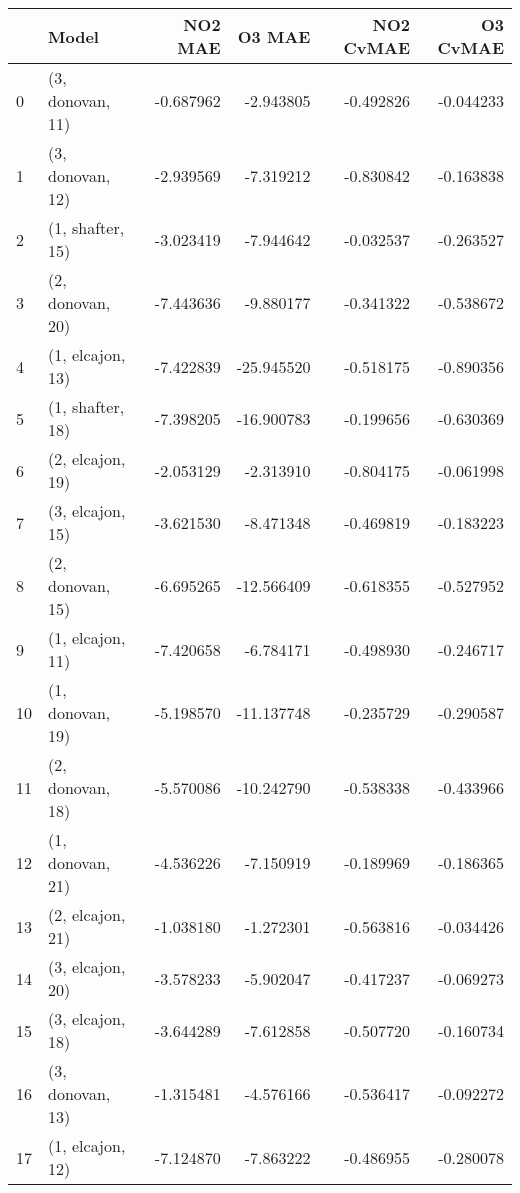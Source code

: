 \begin{tabular}{llrrrr}
\toprule
{} &             Model &   NO2 MAE &     O3 MAE &  NO2 CvMAE &  O3 CvMAE \\
\midrule
0  &  (3, donovan, 11) & -0.687962 &  -2.943805 &  -0.492826 & -0.044233 \\
1  &  (3, donovan, 12) & -2.939569 &  -7.319212 &  -0.830842 & -0.163838 \\
2  &  (1, shafter, 15) & -3.023419 &  -7.944642 &  -0.032537 & -0.263527 \\
3  &  (2, donovan, 20) & -7.443636 &  -9.880177 &  -0.341322 & -0.538672 \\
4  &  (1, elcajon, 13) & -7.422839 & -25.945520 &  -0.518175 & -0.890356 \\
5  &  (1, shafter, 18) & -7.398205 & -16.900783 &  -0.199656 & -0.630369 \\
6  &  (2, elcajon, 19) & -2.053129 &  -2.313910 &  -0.804175 & -0.061998 \\
7  &  (3, elcajon, 15) & -3.621530 &  -8.471348 &  -0.469819 & -0.183223 \\
8  &  (2, donovan, 15) & -6.695265 & -12.566409 &  -0.618355 & -0.527952 \\
9  &  (1, elcajon, 11) & -7.420658 &  -6.784171 &  -0.498930 & -0.246717 \\
10 &  (1, donovan, 19) & -5.198570 & -11.137748 &  -0.235729 & -0.290587 \\
11 &  (2, donovan, 18) & -5.570086 & -10.242790 &  -0.538338 & -0.433966 \\
12 &  (1, donovan, 21) & -4.536226 &  -7.150919 &  -0.189969 & -0.186365 \\
13 &  (2, elcajon, 21) & -1.038180 &  -1.272301 &  -0.563816 & -0.034426 \\
14 &  (3, elcajon, 20) & -3.578233 &  -5.902047 &  -0.417237 & -0.069273 \\
15 &  (3, elcajon, 18) & -3.644289 &  -7.612858 &  -0.507720 & -0.160734 \\
16 &  (3, donovan, 13) & -1.315481 &  -4.576166 &  -0.536417 & -0.092272 \\
17 &  (1, elcajon, 12) & -7.124870 &  -7.863222 &  -0.486955 & -0.280078 \\
\bottomrule
\end{tabular}

